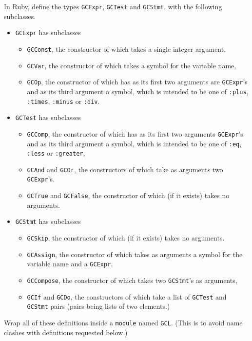 \documentclass[11pt]{article}
\theoremstyle{definition}
\begin{document}
In Ruby, define the types \texttt{GCExpr}, \texttt{GCTest} and \texttt{GCStmt},
with the following subclasses.
\begin{itemize}
\item \texttt{GCExpr} has subclasses
\begin{itemize}
\item \texttt{GCConst}, the constructor of which takes a single integer argument,
\item \texttt{GCVar}, the constructor of which takes a symbol for the variable name,
\item \texttt{GCOp}, the constructor of which has as its first two arguments are \texttt{GCExpr}'s
and as its third argument a symbol,
which is intended to be one of \texttt{:plus}, \texttt{:times}, \texttt{:minus} or \texttt{:div}.
\end{itemize}
\item \texttt{GCTest} has subclasses
\begin{itemize}
\item \texttt{GCComp}, the constructor of which has as its first two arguments \texttt{GCExpr}'s
and as its third argument a symbol,
which is intended to be one of \texttt{:eq}, \texttt{:less} or \texttt{:greater},
\item \texttt{GCAnd} and \texttt{GCOr}, the constructors of which take as arguments two \texttt{GCExpr}'s.
\item \texttt{GCTrue} and \texttt{GCFalse}, the constructor of which (if it exists) takes no arguments.
\end{itemize}
\item \texttt{GCStmt} has subclasses
\begin{itemize}
\item \texttt{GCSkip}, the constructor of which (if it exists) takes no arguments.
\item \texttt{GCAssign}, the constructor of which takes as arguments
a symbol for the variable name and a \texttt{GCExpr}.
\item \texttt{GCCompose}, the constructor of which takes two \texttt{GCStmt}'s as arguments,
\item \texttt{GCIf} and \texttt{GCDo}, the constructors of which
take a list of \texttt{GCTest} and \texttt{GCStmt} pairs
(pairs being lists of two elements.)
\end{itemize}
\end{itemize}

Wrap all of these definitions inside a \texttt{module} named \texttt{GCL}.
(This is to avoid name clashes with definitions requested below.)
\end{document}
